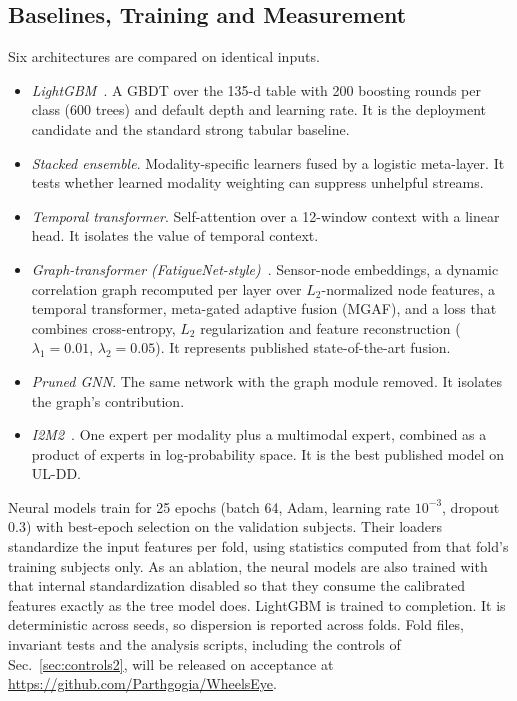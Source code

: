 \documentclass[journal]{IEEEtran}
\begin{document}
\subsection{Baselines, Training and Measurement}
\label{sec:models}
Six architectures are compared on identical inputs.
\begin{itemize}
\item \emph{LightGBM}~\cite{ke2017lightgbm}. A GBDT over the 135-d table with
200 boosting rounds per class (600 trees) and default depth and learning rate.
It is the deployment candidate and the standard strong tabular baseline.
\item \emph{Stacked ensemble}. Modality-specific learners fused by a logistic
meta-layer. It tests whether learned modality weighting can suppress
unhelpful streams.
\item \emph{Temporal transformer}. Self-attention over a 12-window context
with a linear head. It isolates the value of temporal context.
\item \emph{Graph-transformer (FatigueNet-style)}~\cite{zendehbad2025fatiguenet}.
Sensor-node embeddings, a dynamic correlation graph recomputed per layer over
$L_2$-normalized node features, a temporal transformer, meta-gated adaptive
fusion (MGAF), and a loss that combines cross-entropy, $L_2$ regularization
and feature reconstruction ($\lambda_1=0.01$, $\lambda_2=0.05$). It
represents published state-of-the-art fusion.
\item \emph{Pruned GNN}. The same network with the graph module removed. It
isolates the graph's contribution.
\item \emph{I2M2}~\cite{madaan2024i2m2}. One expert per modality plus a
multimodal expert, combined as a product of experts in log-probability space.
It is the best published model on UL-DD.
\end{itemize}
Neural models train for 25 epochs (batch 64, Adam, learning rate $10^{-3}$,
dropout 0.3) with best-epoch selection on the validation subjects. Their
loaders standardize the input features per fold, using statistics computed
from that fold's training subjects only. As an ablation, the neural models are also trained with that
internal standardization disabled so that they consume the calibrated
features exactly as the tree model does. LightGBM is trained to completion.
It is deterministic across seeds, so dispersion is reported across folds.
Fold files, invariant tests and the analysis scripts, including the controls
of Sec.~\ref{sec:controls2}, will be released on acceptance at
\url{https://github.com/Parthgogia/WheelsEye}.
\end{document}
